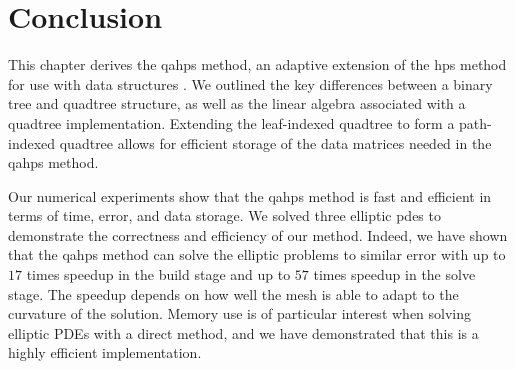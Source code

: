 \section{Conclusion}
\label{sec:conclusion}

This chapter derives the \gls{qahps} method, an adaptive extension of the \gls{hps} method \citep{gillman2014direct} for use with \pforest data structures \citep{burstedde2011p4est}. We outlined the key differences between a binary tree and quadtree structure, as well as the linear algebra associated with a quadtree implementation. Extending the leaf-indexed quadtree to form a path-indexed quadtree allows for efficient storage of the data matrices needed in the \gls{qahps} method.

Our numerical experiments show that the \gls{qahps} method is fast and efficient in terms of time, error, and data storage. We solved three elliptic \gls{pdes} to demonstrate the correctness and efficiency of our method. Indeed, we have shown that the \gls{qahps} method can solve the elliptic problems to similar error with up to $17$ times speedup in the build stage and up to $57$ times speedup in the solve stage. The speedup depends on how well the mesh is able to adapt to the curvature of the solution. Memory use is of particular interest when solving elliptic PDEs with a direct method, and we have demonstrated that this is a highly efficient implementation.